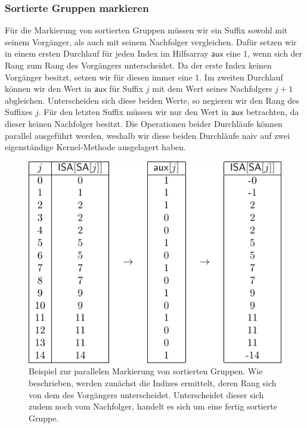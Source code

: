 \subsubsection{Sortierte Gruppen markieren}
Für die Markierung von sortierten Gruppen müssen wir ein Suffix sowohl mit seinem Vorgänger, als auch mit seinem Nachfolger vergleichen. Dafür setzen wir in einem ersten Durchlauf für jeden Index im Hilfsarray $\mathsf{aux}$ eine 1, wenn sich der Rang zum Rang des Vorgängers unterscheidet. Da der erste Index keinen Vorgänger besitzt, setzen wir für diesen immer eine 1. Im zweiten Durchlauf können wir den Wert in $\mathsf{aux}$ für Suffix $j$ mit dem Wert seines Nachfolgers $j+1$ abgleichen. Unterscheiden sich diese beiden Werte, so negieren wir den Rang des Suffixes $j$. Für den letzten Suffix müssen wir nur den Wert in $\mathsf{aux}$ betrachten, da dieser keinen Nachfolger besitzt.
Die Operationen beider Durchläufe können parallel ausgeführt werden, weshalb wir diese beiden Durchläufe naiv auf zwei eigenständige Kernel-Methode ausgelagert haben.
\begin{center}
\begin{figure}
\includegraphics[scale=1]{kapitel/saca_algorithmen/osipov/mark_singletons_example.pdf}
\caption{Beispiel zur parallelen Markierung von sortierten Gruppen. Wie beschrieben, werden zunächst die Indizes ermittelt, deren Rang sich von dem des Vorgängers unterscheidet. Unterscheidet dieser sich zudem noch vom Nachfolger, handelt es sich um eine fertig sortierte Gruppe.}
\end{figure}

\end{center}
